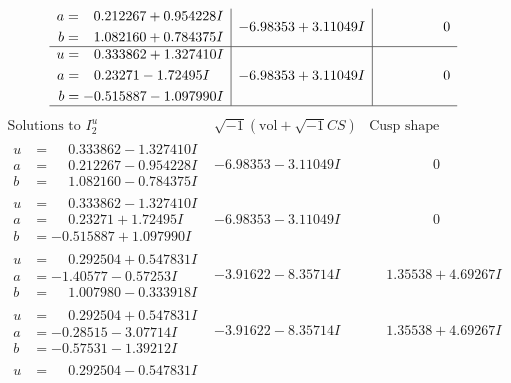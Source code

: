 \documentclass[1p]{elsarticle_modified}
\theoremstyle{definition}
\newcommand{\I}{\sqrt{-1}}
\begin{document}
$$\begin{array}{c|c|c}
\begin{aligned}
a &= \phantom{-}0.212267 + 0.954228 I \\
b &= \phantom{-}1.082160 + 0.784375 I\end{aligned}
 & -6.98353 + 3.11049 I & \phantom{-0.000000 } 0 \\ \hline\begin{aligned}
u &= \phantom{-}0.333862 + 1.327410 I \\
a &= \phantom{-}0.23271 - 1.72495 I \\
b &= -0.515887 - 1.097990 I\end{aligned}
 & -6.98353 + 3.11049 I & \phantom{-0.000000 } 0\\
 \hline 
 \end{array}$$\newpage$$\begin{array}{c|c|c}  
\text{Solutions to }I^u_{2}& \I (\text{vol} + \sqrt{-1}CS) & \text{Cusp shape}\\
 \hline 
\begin{aligned}
u &= \phantom{-}0.333862 - 1.327410 I \\
a &= \phantom{-}0.212267 - 0.954228 I \\
b &= \phantom{-}1.082160 - 0.784375 I\end{aligned}
 & -6.98353 - 3.11049 I & \phantom{-0.000000 } 0 \\ \hline\begin{aligned}
u &= \phantom{-}0.333862 - 1.327410 I \\
a &= \phantom{-}0.23271 + 1.72495 I \\
b &= -0.515887 + 1.097990 I\end{aligned}
 & -6.98353 - 3.11049 I & \phantom{-0.000000 } 0 \\ \hline\begin{aligned}
u &= \phantom{-}0.292504 + 0.547831 I \\
a &= -1.40577 - 0.57253 I \\
b &= \phantom{-}1.007980 - 0.333918 I\end{aligned}
 & -3.91622 - 8.35714 I & \phantom{-}1.35538 + 4.69267 I \\ \hline\begin{aligned}
u &= \phantom{-}0.292504 + 0.547831 I \\
a &= -0.28515 - 3.07714 I \\
b &= -0.57531 - 1.39212 I\end{aligned}
 & -3.91622 - 8.35714 I & \phantom{-}1.35538 + 4.69267 I \\ \hline\begin{aligned}
u &= \phantom{-}0.292504 - 0.547831 I \\

\end{aligned}
\end{array}$$
\end{document}
